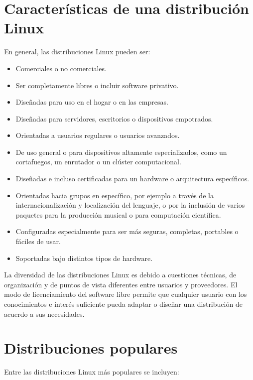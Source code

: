 \section{Características de una distribución Linux}
En general, las distribuciones Linux pueden ser:
\begin{itemize}
\item Comerciales o no comerciales.
\item Ser completamente libres o incluir software privativo.
\item Diseñadas para uso en el hogar o en las empresas.
\item Diseñadas para servidores, escritorios o dispositivos empotrados.
\item Orientadas a usuarios regulares o usuarios avanzados.
\item De uso general o para dispositivos altamente especializados, como un cortafuegos, un enrutador o un clúster computacional.
\item Diseñadas e incluso certificadas para un hardware o arquitectura específicos.
\item Orientadas hacia grupos en específico, por ejemplo a través de la internacionalización y localización del lenguaje, o por la inclusión de varios paquetes para la producción musical o para computación científica.
\item Configuradas especialmente para ser más seguras, completas, portables o fáciles de usar.
\item Soportadas bajo distintos tipos de hardware.
\end{itemize}

La diversidad de las distribuciones Linux es debido a cuestiones técnicas, de organización y de puntos de vista diferentes entre usuarios y proveedores. El modo de licenciamiento del software libre permite que cualquier usuario con los conocimientos e interés suficiente pueda adaptar o diseñar una distribución de acuerdo a sus necesidades.

\section{Distribuciones populares}

Entre las distribuciones Linux más populares se incluyen:

